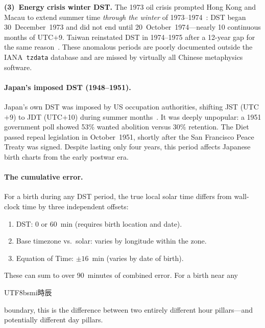 \documentclass[10pt,a4paper]{article}
\newcommand{\zh}[1]{\begin{CJK}{UTF8}{bsmi}#1\end{CJK}}
\begin{document}
\textbf{(3)~Energy crisis winter DST.}
The 1973 oil crisis prompted Hong Kong and Macau to extend summer time
\emph{through the winter} of 1973--1974~\cite{hko_summertime,
wetoasthk_dst}: DST began 30~December~1973 and did not end until
20~October~1974---nearly 10 continuous months of UTC$+$9.  Taiwan
reinstated DST in 1974--1975 after a 12-year gap for the same
reason~\cite{iana_tzdata_asia}.  These anomalous periods are poorly
documented outside the IANA~\texttt{tzdata} database and are missed by
virtually all Chinese metaphysics software.

\paragraph{Japan's imposed DST (1948--1951).}
Japan's own DST was imposed by US occupation authorities, shifting JST
(UTC$+$9) to JDT (UTC$+$10) during summer
months~\cite{japan_dst_abolition, iana_tzdata_asia}.  It was deeply
unpopular: a 1951 government poll showed 53\% wanted abolition versus
30\% retention.  The Diet passed repeal legislation in October~1951,
shortly after the San Francisco Peace Treaty was signed.  Despite
lasting only four years, this period affects Japanese birth charts from
the early postwar era.

\paragraph{The cumulative error.}
For a birth during any DST period, the true local solar time
differs from wall-clock time by three independent offsets:
\begin{enumerate}[nosep]
  \item DST: 0 or 60~min (requires birth location and date).
  \item Base timezone vs.\ solar: varies by longitude within the zone.
  \item Equation of Time: $\pm 16$~min (varies by date of birth).
\end{enumerate}
These can sum to over 90~minutes of combined error.  For a birth near
any \zh{時辰} boundary, this is the difference between two entirely
different hour pillars---and potentially different day pillars.
\end{document}
